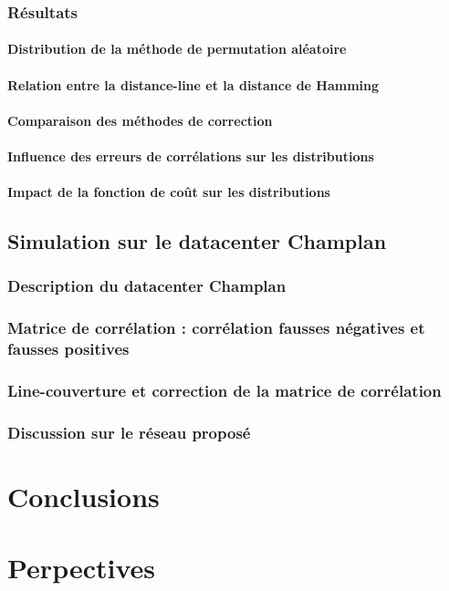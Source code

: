 \documentclass[onecolumn, 12pt]{book}
\begin{document}
		\subsection{R\'esultats}
			\subsubsection{Distribution de la m\'ethode de permutation al\'eatoire}
			\subsubsection{Relation entre la distance-line et la distance de Hamming}
			\subsubsection{Comparaison des m\'ethodes de correction}
			\subsubsection{Influence des erreurs de corr\'elations sur les distributions}
			\subsubsection{Impact de la fonction de co\^ut sur les distributions}
	\section{Simulation sur le datacenter Champlan}
		\subsection{Description du datacenter Champlan}
		\subsection{Matrice de corr\'elation : corr\'elation fausses n\'egatives et fausses positives}
		\subsection{Line-couverture et correction de la matrice de corr\'elation}
		\subsection{Discussion sur le r\'eseau propos\'e}
	
\chapter{Conclusions}
\chapter{Perpectives}
\tableofcontents
 
\end{document}
